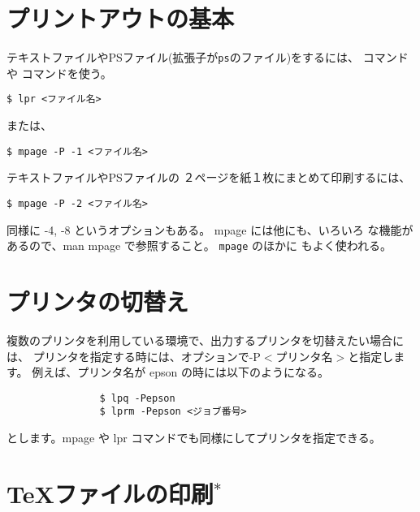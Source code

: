 \documentclass{jreport}
\begin{document}
\section{プリントアウトの基本}

テキストファイルやPSファイル(拡張子が\verb|ps|のファイル)をするには、
 コマンドや コマンドを使う。
\begin{screen}
\begin{verbatim}
$ lpr <ファイル名>
\end{verbatim}
\end{screen}
または、 
\begin{screen}
\begin{verbatim}
$ mpage -P -1 <ファイル名>
\end{verbatim}
\end{screen}


テキストファイルやPSファイルの ２ページを紙１枚にまとめて印刷するには、
\begin{screen}
\begin{verbatim}
$ mpage -P -2 <ファイル名>
\end{verbatim}
\end{screen}
同様に -4, -8 というオプションもある。 mpage には他にも、いろいろ
な機能があるので、man mpage で参照すること。
\verb|mpage| のほかに  もよく使われる。

\section{プリンタの切替え}

複数のプリンタを利用している環境で、出力するプリンタを切替えたい場合に
は、
プリンタを指定する時には、オプションで{\ttfamily -P{$<$}プリンタ名{$>$}}と指定します。
例えば、プリンタ名が epson の時には以下のようになる。
\begin{screen}
\begin{verbatim}
                $ lpq -Pepson
                $ lprm -Pepson <ジョブ番号>
\end{verbatim}
\end{screen}

とします。mpage や lpr コマンドでも同様にしてプリンタを指定できる。



\section{\TeX ファイルの印刷$^*$}
\end{document}

